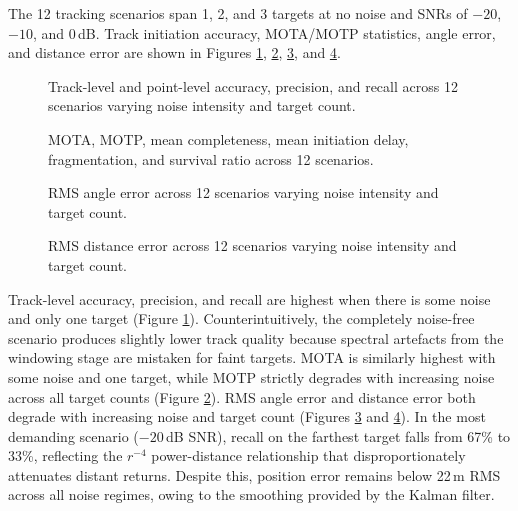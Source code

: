 The 12 tracking 
scenarios span 1, 2, and 3 targets at no noise and SNRs of $-20$, $-10$, and 0\,dB.
Track initiation accuracy, MOTA/MOTP statistics, angle error, and distance error are shown
in Figures \ref{fig:tracking-initiation-accuracy}, \ref{fig:tracking-position-accuracy},
\ref{fig:tracking-angle-error}, and \ref{fig:tracking-distance-error}.

\begin{figure}
    \caption[Tracking initiation accuracy and track health.]{Track-level and point-level
    accuracy, precision, and recall across 12 scenarios varying noise intensity and target
    count.}
    \label{fig:tracking-initiation-accuracy}
\end{figure}

\begin{figure}
    \caption[Tracking MOTA statistics.]{MOTA, MOTP, mean completeness, mean initiation
    delay, fragmentation, and survival ratio across 12 scenarios.}
    \label{fig:tracking-position-accuracy}
\end{figure}

\begin{figure}
    \caption[Tracking RMS angle error.]{RMS angle error across 12 scenarios varying noise
    intensity and target count.}
    \label{fig:tracking-angle-error}
\end{figure}

\begin{figure}
    \caption[Tracking RMS distance error.]{RMS distance error across 12 scenarios varying
    noise intensity and target count.}
    \label{fig:tracking-distance-error}
\end{figure}

Track-level accuracy, precision, and recall are highest when there is some noise and only
one target (Figure \ref{fig:tracking-initiation-accuracy}). Counterintuitively, the
completely noise-free scenario produces slightly lower track quality because spectral
artefacts from the windowing stage are mistaken for faint targets. MOTA is similarly
highest with some noise and one target, while MOTP strictly degrades with increasing noise
across all target counts (Figure \ref{fig:tracking-position-accuracy}). RMS angle error
and distance error both degrade with increasing noise and target count (Figures
\ref{fig:tracking-angle-error} and \ref{fig:tracking-distance-error}). In the most
demanding scenario ($-20$\,dB SNR), recall on the farthest target falls from 67\% to 33\%, 
reflecting the $r^{-4}$ power-distance relationship
that disproportionately attenuates distant returns. Despite this, position error remains
below 22\,m RMS across all noise regimes, owing to the smoothing provided by the Kalman
filter.
